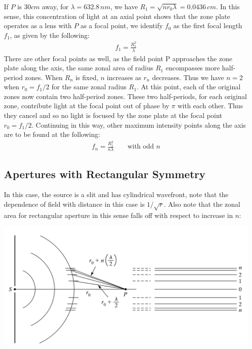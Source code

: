 \documentclass[11pt]{book}
\theoremstyle{break}
\theoremstyle{break}
\begin{document}
If $P$ is $30 cm$ away, for $\lambda = 632.8\, nm$, we have $R_1 =\sqrt{nr_0 \lambda} =0.0436\, cm$. In this sense, this concentration of light at an axial point shows that the zone plate operates as a lens with $P$ as
a focal point, we identify $f_0$ as the first focal length $f_1$, as given by the following:
\begin{align*}
f_1 = \frac{R_1^2}{\lambda}
\end{align*}
There are other focal points as well, as the field point P approaches the zone
plate along the axis, the same zonal area of radius $R_1$ encompasses more half-period zones. When $R_n$ is fixed, $n$ increases as $r_n$ decreases. Thus we have $n=2$ when $r_0 = f_1 / 2$ for the same zonal radius $R_1$. At this point, each of the original zones now contain two half-period zones. These two half-periods, for each original zone, contribute light at the focal point out of phase by $\pi $ with each other. Thus they cancel and so no light is focused by the zone plate at the focal point $r_0 = f_1/2$. Continuing in this way, other maximum intensity points along the axis are to be found at the following:
\begin{align*}
f_n = \frac{R_1^2}{n\lambda} \qquad \text{with odd }n
\end{align*}


\subsection{Apertures with Rectangular Symmetry}
In this case, the source is a slit and has cylindrical wavefront, note that the dependence of field with distance in this case is $1/\sqrt{r}$. Also note that the zonal area for rectangular aperture in this sense falls off with respect to increase in $n$:
\begin{center}
\includegraphics[scale=0.55]{reactZone}
\end{center}
\end{document}
